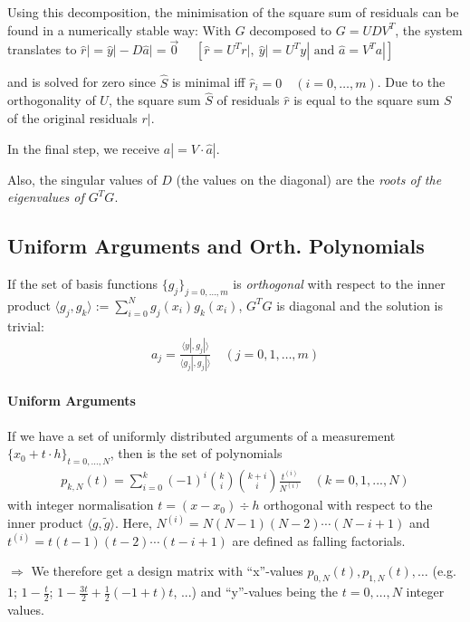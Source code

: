 Using this decomposition, the minimisation of the square sum of residuals can be found in a numerically stable way:
With $G$ decomposed to $G=UDV^T$, the system translates to
\colorbox{shadecolor}{
    $\hat{r}| = \hat{y}| - D\hat{a}| = \vec{0}\quad$
        {\color{darkgray} $\left[\hat{r} = U^Tr|,\ \hat{y}| = U^Ty|\text{ and }\hat{a} = V^Ta|\right]$}
}

and is solved for zero since $\hat{S}$ is minimal iff $\hat{r}_i=0\quad(i=0,\ldots,m)$.
Due to the orthogonality of $U$, the square sum $\hat{S}$ of residuals $\hat{r}$ is equal to the square sum $S$ of the original
residuals $r|$.

In the final step, we receive $a| = V\cdot\hat{a}|$.

Also, the singular values of $D$ (the values on the diagonal) 
are the \emph{roots of the eigenvalues of $G^TG$}.

\subsection{Uniform Arguments and Orth. Polynomials}

If the set of basis functions $\{g_j\}_{j=0,\ldots,m}$ is \emph{orthogonal} with respect to the inner product
$\langle g_j,g_k\rangle := \sum_{i=0}^N g_j(x_i)g_k(x_i)$, $G^TG$ is diagonal and the solution is trivial:
\begin{align*}
    a_j=\frac{\langle y|, g_j|\rangle}{\langle g_j|, g_j|\rangle}\quad(j=0,1,\ldots,m)
\end{align*}

\paragraph{Uniform Arguments}
If we have a set of uniformly distributed arguments of a measurement $\{x_0 + t\cdot h\}_{t=0,\ldots,N}$,
then is the set of polynomials
\begin{align*}
    p_{k,N}(t)
    = \sum_{i=0}^{k}(-1)^{i}{\binom{k}{i}}{\binom{k+i}{i}}{\frac{t^{(i)}}{N^{(i)}}}\quad(k=0,1,...,N)
\end{align*}
with integer normalisation $t = (x-x_0)\div h$ orthogonal with respect to the inner product $\langle g,\tilde{g}\rangle$.
Here, $N^{(i)} = N(N-1)(N-2)\cdots(N-i+1)$ and $t^{(i)} = t(t-1)(t-2)\cdots(t-i+1)$ are defined as falling factorials.

$\Rightarrow$ We therefore get a design matrix with ``x''-values $p_{0,N}(t), p_{1,N}(t),\ldots$
(e.g. $1$; $1-\frac{t}{2}$; $1-\frac{3t}{2}+\frac{1}{2}(-1+t)t$, ...) and ``y''-values being the $t=0,\ldots,N$ integer values.

